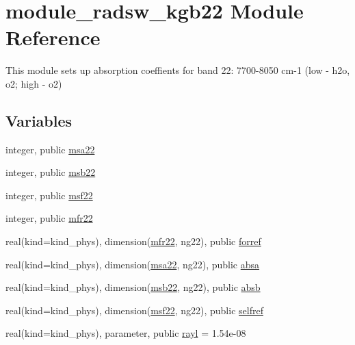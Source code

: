 \hypertarget{namespacemodule__radsw__kgb22}{}\section{module\+\_\+radsw\+\_\+kgb22 Module Reference}
\label{namespacemodule__radsw__kgb22}


This module sets up absorption coeffients for band 22\+: 7700-\/8050 cm-\/1 (low -\/ h2o, o2; high -\/ o2)  


\subsection*{Variables}
\begin{DoxyCompactItemize}
\item 
integer, public \hyperlink{namespacemodule__radsw__kgb22_a4134c2cd3b31db5e0adb5c3c2ad87905}{msa22}
\item 
integer, public \hyperlink{namespacemodule__radsw__kgb22_a3398f8d12ec0349b44197873ac58fd98}{msb22}
\item 
integer, public \hyperlink{namespacemodule__radsw__kgb22_a0903a020c9e4a4f7c21911d2ab98fd46}{msf22}
\item 
integer, public \hyperlink{namespacemodule__radsw__kgb22_a0afe8facbe4837a22c96a0d2000a20ee}{mfr22}
\item 
real(kind=kind\+\_\+phys), dimension(\hyperlink{namespacemodule__radsw__kgb22_a0afe8facbe4837a22c96a0d2000a20ee}{mfr22}, ng22), public \hyperlink{namespacemodule__radsw__kgb22_a509916fac772945555a1b3fd0d002c93}{forref}
\item 
real(kind=kind\+\_\+phys), dimension(\hyperlink{namespacemodule__radsw__kgb22_a4134c2cd3b31db5e0adb5c3c2ad87905}{msa22}, ng22), public \hyperlink{namespacemodule__radsw__kgb22_a15ed79e7136ed6d7f11c19a81281af53}{absa}
\item 
real(kind=kind\+\_\+phys), dimension(\hyperlink{namespacemodule__radsw__kgb22_a3398f8d12ec0349b44197873ac58fd98}{msb22}, ng22), public \hyperlink{namespacemodule__radsw__kgb22_a60403e7d343c85e965f3507b0db0f2a5}{absb}
\item 
real(kind=kind\+\_\+phys), dimension(\hyperlink{namespacemodule__radsw__kgb22_a0903a020c9e4a4f7c21911d2ab98fd46}{msf22}, ng22), public \hyperlink{namespacemodule__radsw__kgb22_abc3bd99e8ad7d1f09fb7fab7ed67a32b}{selfref}
\item 
real(kind=kind\+\_\+phys), parameter, public \hyperlink{namespacemodule__radsw__kgb22_ae77b766677ea476e2ba14b88e511870a}{rayl} = 1.\+54e-\/08
\end{DoxyCompactItemize}


